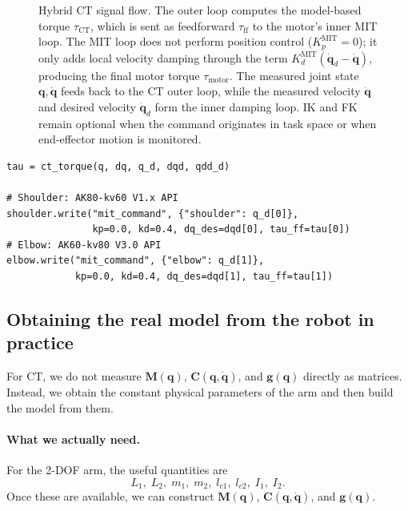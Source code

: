 \documentclass[11pt,a4paper]{article}
\newcommand{\vq}{\bm{q}}
\newcommand{\vqd}{\dot{\bm{q}}}
\newcommand{\M}{\bm{M}}
\newcommand{\Cor}{\bm{C}}
\newcommand{\vg}{\bm{g}}
\begin{document}
\begin{figure}[H]
{%
}
\caption{Hybrid CT signal flow.  The outer loop computes the model-based torque $\tau_{\mathrm{CT}}$, which is sent as feedforward $\tau_{\mathrm{ff}}$ to the motor's inner MIT loop.  The MIT loop does not perform position control ($K_p^{\mathrm{MIT}}=0$); it only adds local velocity damping through the term $K_d^{\mathrm{MIT}}(\vqd_d-\vqd)$, producing the final motor torque $\tau_{\mathrm{motor}}$.  The measured joint state $\vq,\vqd$ feeds back to the CT outer loop, while the measured velocity $\vqd$ and desired velocity $\vqd_d$ form the inner damping loop.  IK and FK remain optional when the command originates in task space or when end-effector motion is monitored.}
\label{fig:hybrid_ct_block_diagram}
\end{figure}

\begin{lstlisting}[caption={Hybrid CT: model feedforward + small on-board damping.}]
tau = ct_torque(q, dq, q_d, dqd, qdd_d)

# Shoulder: AK80-kv60 V1.x API
shoulder.write("mit_command", {"shoulder": q_d[0]},
               kp=0.0, kd=0.4, dq_des=dqd[0], tau_ff=tau[0])
# Elbow: AK60-kv80 V3.0 API
elbow.write("mit_command", {"elbow": q_d[1]},
            kp=0.0, kd=0.4, dq_des=dqd[1], tau_ff=tau[1])
\end{lstlisting}

\subsection{Obtaining the real model from the robot in practice}

For CT, we do not measure $\M(\vq)$, $\Cor(\vq,\vqd)$, and $\vg(\vq)$ directly as matrices.
Instead, we obtain the constant physical parameters of the arm and then build
the model from them.

\paragraph{What we actually need.}
For the 2-DOF arm, the useful quantities are
\begin{equation}
  L_1,\; L_2,\; m_1,\; m_2,\; l_{c1},\; l_{c2},\; I_1,\; I_2.
\end{equation}
Once these are available, we can construct $\M(\vq)$, $\Cor(\vq,\vqd)$, and
$\vg(\vq)$.
\end{document}
